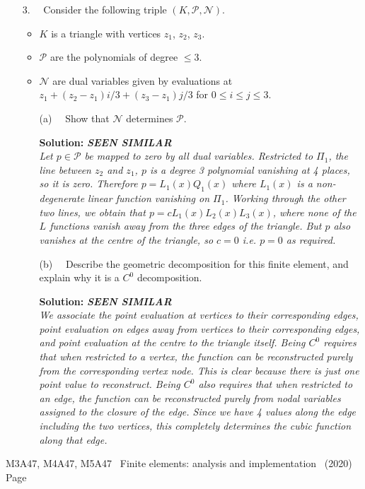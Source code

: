 \documentclass[12pt]{article}
\newcommand{\coursenum}{M3A47, M4A47, M5A47} %
\newcommand{\coursename}{Finite elements: analysis and implementation} %
\newcommand{\similar}{{\bfseries SEEN SIMILAR\\}}
\newcommand{\exammarks}[1]{\begin{flushright}[#1 marks]\end{flushright}}%
\newcommand{\soln}[1]{{\bfseries Solution:} {\itshape \color{blue} #1}}
\newcommand{\soln}[1]{}
\newcommand{\examyear}{2020}
\newenvironment{Question}[1] 
 {\begin{itemize} \item[\large #1.~~]}{\end{itemize} \medskip}
\newcommand{\EndPage}{
	\vfill \coursenum ~ \coursename ~
	(\examyear) \hfill Page \thepage \newpage
	}
\newcommand{\BeginParts}{\begin{itemize}}
\newcommand{\Part}[1]{\item [(#1)~~]}
\newcommand{\EndParts}{\end{itemize}}
\begin{document}
\begin{Question}{3}
  Consider the following triple $(K,\mathcal{P},\mathcal{N})$.
  \begin{itemize}
  \item $K$ is a triangle with vertices $z_1$, $z_2$, $z_3$.
  \item $\mathcal{P}$ are the polynomials of degree $\leq 3$.
  \item $\mathcal{N}$ are dual variables given by evaluations at
    $z_1 + (z_2-z_1)i/3 + (z_3-z_1)j/3$ for $0\leq i \leq j \leq 3$.
  \end{itemize}
  \BeginParts
  \Part{a} 
  Show that $\mathcal{N}$ determines $\mathcal{P}$.  \exammarks{10}
  \soln{ \similar Let $p\in \mathcal{P}$ be mapped to zero by all dual
    variables.  Restricted to $\Pi_1$, the line between $z_2$ and
    $z_1$, $p$ is a degree 3 polynomial vanishing at 4 places, so it
    is zero. Therefore $p=L_1(x)Q_1(x)$ where $L_1(x)$ is a non-degenerate
    linear function vanishing on $\Pi_1$. Working through the other two
    lines, we obtain that $p=cL_1(x)L_2(x)L_3(x)$, where none of the $L$
    functions vanish away from the three edges of the triangle. But $p$
    also vanishes at the centre of the triangle, so $c=0$ i.e. $p=0$
    as required.}
  \Part{b} Describe the geometric decomposition for this finite element,
  and explain why it is a $C^0$ decomposition.  \exammarks{10} \soln{
    \similar 
    We associate the point evaluation at vertices to their
    corresponding edges, point evaluation on edges away from vertices
    to their corresponding edges, and point evaluation at the centre
    to the triangle itself.  Being $C^0$ requires that when restricted
    to a vertex, the function can be reconstructed purely from the
    corresponding vertex node. This is clear because there is just one
    point value to reconstruct. Being $C^0$ also requires that when
    restricted to an edge, the function can be reconstructed purely
    from nodal variables assigned to the closure of the edge. Since we
    have 4 values along the edge including the two vertices, this
    completely determines the cubic function along that edge.  }
  \EndParts
\end{Question}
\EndPage
\end{document}
